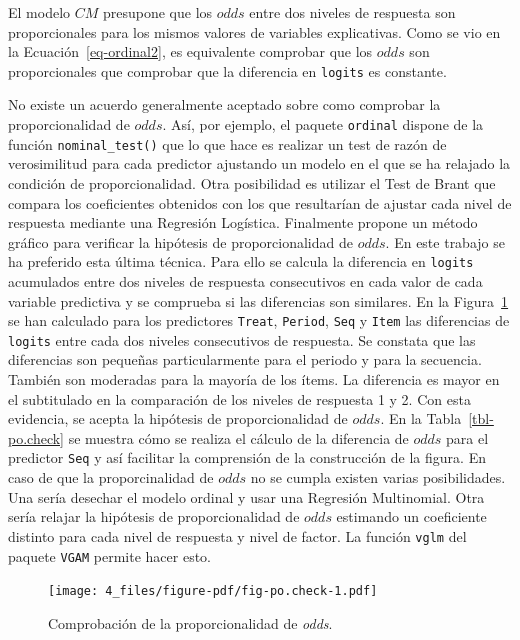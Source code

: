\documentclass[
  12pt,
  a4paper,
  extrafontsizes,
  onecolumn,
  openright,
  table]{memoir}
\begin{document}
El modelo \(CM\) presupone que los \(odds\) entre dos niveles de
respuesta son proporcionales para los mismos valores de variables
explicativas. Como se vio en la Ecuación~\ref{eq-ordinal2}, es
equivalente comprobar que los \(odds\) son proporcionales que comprobar
que la diferencia en \texttt{logits} es constante.

No existe un acuerdo generalmente aceptado sobre como comprobar la
proporcionalidad de \(odds\). Así, por ejemplo, el paquete
\texttt{ordinal} \autocite[ver][]{ordinal} dispone de la función
\texttt{nominal\_test()} que lo que hace es realizar un test de razón de
verosimilitud para cada predictor ajustando un modelo en el que se ha
relajado la condición de proporcionalidad. Otra posibilidad es utilizar
el Test de Brant \autocite[ver][]{brant1990} que compara los
coeficientes obtenidos con los que resultarían de ajustar cada nivel de
respuesta mediante una Regresión Logística. Finalmente \textcite[ver
pp.~315-316]{harrell2015} propone un método gráfico para verificar la
hipótesis de proporcionalidad de \(odds\). En este trabajo se ha
preferido esta última técnica. Para ello se calcula la diferencia en
\texttt{logits} acumulados entre dos niveles de respuesta consecutivos
en cada valor de cada variable predictiva y se comprueba si las
diferencias son similares. En la Figura~\ref{fig-po.check} se han
calculado para los predictores \texttt{Treat}, \texttt{Period},
\texttt{Seq} y \texttt{Item} las diferencias de \texttt{logits} entre
cada dos niveles consecutivos de respuesta. Se constata que las
diferencias son pequeñas particularmente para el periodo y para la
secuencia. También son moderadas para la mayoría de los ítems. La
diferencia es mayor en el subtitulado en la comparación de los niveles
de respuesta 1 y 2. Con esta evidencia, se acepta la hipótesis de
proporcionalidad de \(odds\). En la Tabla~\ref{tbl-po.check} se muestra
cómo se realiza el cálculo de la diferencia de \(odds\) para el
predictor \texttt{Seq} y así facilitar la comprensión de la construcción
de la figura. En caso de que la proporcinalidad de \(odds\) no se cumpla
existen varias posibilidades. Una sería desechar el modelo ordinal y
usar una Regresión Multinomial. Otra sería relajar la hipótesis de
proporcionalidad de \(odds\) estimando un coeficiente distinto para cada
nivel de respuesta y nivel de factor. La función \texttt{vglm} del
paquete \texttt{VGAM} \autocite[ver][]{VGAM} permite hacer esto.

\begin{figure}[h]

{\centering \texttt{[image: 4\_files/figure-pdf/fig-po.check-1.pdf]}

}

\caption{\label{fig-po.check}Comprobación de la proporcionalidad de
\emph{odds}.}

\end{figure}
\end{document}
